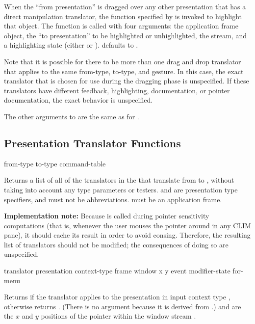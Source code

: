 When the ``from presentation'' is dragged over any other presentation that has a
direct manipulation translator, the function specified by  is
invoked to highlight that object.  The function is called with four arguments:
the application frame object, the ``to presentation'' to be highlighted or
unhighlighted, the stream, and a highlighting state (either  or
).   defaults to
.

Note that it is possible for there to be more than one drag and drop translator
that applies to the same from-type, to-type, and gesture.  In this case, the
exact translator that is chosen for use during the dragging phase is
unspecified.  If these translators have different feedback, highlighting,
documentation, or pointer documentation, the exact behavior is unspecified.

The other arguments to  are the same as for
.


\subsection {Presentation Translator Functions}

 {from-type to-type command-table}

Returns a list of all of the translators in the 
 that translate from  to ,
without taking into account any type parameters or testers.   and
 are presentation type specifiers, and must not be abbreviations.
 must be an application frame.

{\bf Implementation note:} Because  is called
during pointer sensitivity computations (that is, whenever the user mouses the
pointer around in any CLIM pane), it should cache its result in order to avoid
consing.  Therefore, the resulting list of translators should not be modified;
the consequences of doing so are unspecified.


 {translator presentation context-type frame window x y
                                       \key event modifier-state for-menu}

Returns  if the translator  applies to the
presentation  in input context type ,
otherwise returns .  (There is no  argument because
it is derived from .)   and  are the $x$ and $y$
positions of the pointer within the window stream .

